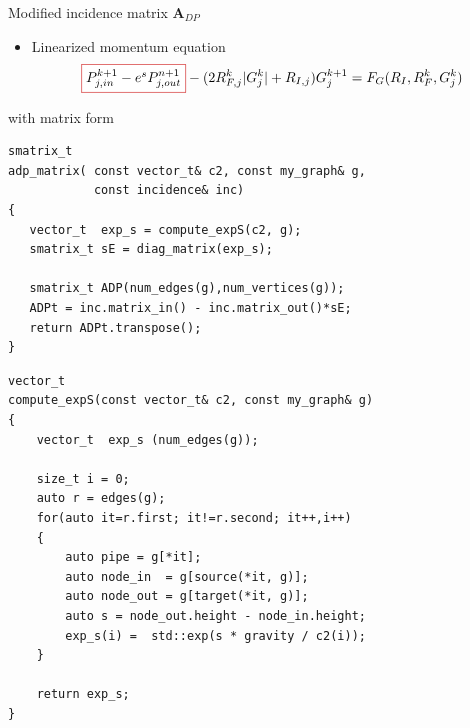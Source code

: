 \begin{frame}[fragile]{Modified incidence matrix $\mathbf{A}_{DP}$}
\noindent
\begin{itemize}
    \setlength{\itemindent}{-2.em}
    \item Linearized momentum equation
    \begin{equation*}
        \fbox{$P_{j,in}^{k+1} - e^sP_{j,out}^{n+1}$} - (2R^k_{F,j}|G_j^{k}| + R_{I,j}) G_j^{k+1} = F_G(R_{I},R^k_F,G_j^{k})
    \end{equation*}
\end{itemize}

\begin{minipage}{0.465\textwidth}
with matrix form
\begin{center}
     
\end{center}
\vspace{-0.5cm}
\begin{verbatim}
smatrix_t
adp_matrix( const vector_t& c2, const my_graph& g,
            const incidence& inc)
{ 
   vector_t  exp_s = compute_expS(c2, g);
   smatrix_t sE = diag_matrix(exp_s);  

   smatrix_t ADP(num_edges(g),num_vertices(g));
   ADPt = inc.matrix_in() - inc.matrix_out()*sE;
   return ADPt.transpose();
}    
\end{verbatim}    
\end{minipage}
\hfill
\begin{minipage}{0.47\textwidth}
    \begin{verbatim}
vector_t
compute_expS(const vector_t& c2, const my_graph& g)
{   
    vector_t  exp_s (num_edges(g)); 

    size_t i = 0;
    auto r = edges(g);
    for(auto it=r.first; it!=r.second; it++,i++)
    {
        auto pipe = g[*it];   
        auto node_in  = g[source(*it, g)];
        auto node_out = g[target(*it, g)];
        auto s = node_out.height - node_in.height;
        exp_s(i) =  std::exp(s * gravity / c2(i)); 
    }

    return exp_s;       
}
    \end{verbatim}
\end{minipage}
\end{frame}

